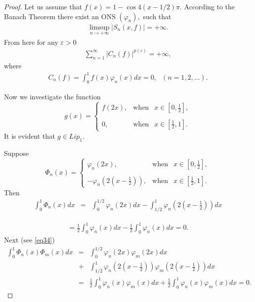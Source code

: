 \documentclass{publmathdeb}
\begin{document}
	\begin{proof}
		Let us assume that $f(x)=1-\cos 4(x- 1/2) \pi.$ According to the Banach Theorem there exist an ONS $(\varphi_n),$ such that 
		\begin{eqnarray}
			\label{eq31} \limsup_{n \rightarrow +\infty} \left|S_n (x, f)\right| =+\infty.
		\end{eqnarray}
		From here for any $\varepsilon >0$
		\begin{eqnarray}\label{eq32}
			\sum_{n=1}^{\infty} \left|C_n(f)\right| ^{p(\varepsilon)} =+ \infty, 
		\end{eqnarray}
		where 
		\begin{eqnarray*}
			C_n(f)= \int_{0}^{1} f(x) \varphi_n (x) dx =0,  \ \ \ (n=1, 2, \dots).
		\end{eqnarray*}
		
		Now we investigate the function
		\begin{equation} \label{eq33}
			g\left( x\right) =\left\{ 
			\begin{array}{ccc}
				f(2x), & \text{when} & x\in \left[ 0,\frac{1}{2}\right], \\ 
				\\
				0, & \text{when} & x\in \left[ \frac{1}{2},1\right].
			\end{array}%
			\right.
		\end{equation}
		It is evident that $g\in Lip_1.$
		
		Suppose  
		\begin{equation} \label{eq34}
			\Phi_n\left( x\right) =\left\{ 
			\begin{array}{ccc}
				\varphi_{n}(2x), & \text{when} & x\in \left[ 0,\frac{1}{2}\right], \\ 
				\\
				- \varphi_{n} \left(2\left(x-\frac{1}{2}\right)\right), & \text{when} & x\in \left[ \frac{1}{2},1\right].
			\end{array}%
			\right.
		\end{equation}
		Then
		\begin{eqnarray*}
			\int_{0}^{1} \Phi_n (x) dx &=& \int_{0}^{1/2} \varphi_{n}(2x) dx -  \int_{1/2}^{1} \varphi_{n} \left(2\left(x-\frac{1}{2}\right)\right) dx
		\end{eqnarray*}
		
		\begin{eqnarray*}
			= \frac{1}{2} \int_{0}^{1} \varphi_{n}(x) dx - \frac{1}{2} \int_{0}^{1} \varphi_{n}(x) dx = 0.
		\end{eqnarray*}
		Next (see \eqref{eq34})
		\begin{eqnarray*}
			\int_{0}^{1} \Phi_n (x) \Phi_m (x)dx &=& \int_{0}^{1/2} \varphi_{n}(2x) \varphi_{m}(2x)dx \\ &+&  \int_{1/2}^{1} \varphi_{n} \left(2\left(x-\frac{1}{2}\right)\right) \varphi_{m} \left(2\left(x-\frac{1}{2}\right)\right)dx\\ &=& \frac{1}{2} \int_{0}^{1} \varphi_{n}(x) \varphi_{m}(x)  dx + \frac{1}{2} \int_{0}^{1} \varphi_{n}(x) \varphi_{m}(x)  dx = 0.
		\end{eqnarray*}
		

\end{proof}
\end{document}
